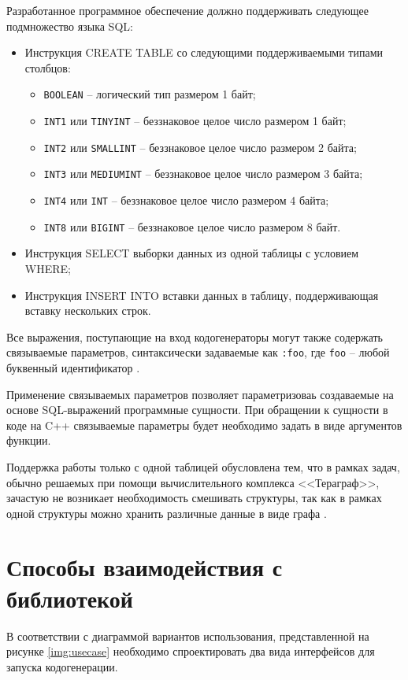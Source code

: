 Разработанное программное обеспечение должно поддерживать следующее подмножество языка SQL:
\begin{itemize}
	\item Инструкция CREATE TABLE со следующими поддерживаемыми типами столбцов:
	\begin{itemize}
		\item \texttt{BOOLEAN} -- логический тип размером 1 байт;
		\item \texttt{INT1} или \texttt{TINYINT} -- беззнаковое целое число размером 1 байт;
		\item \texttt{INT2} или \texttt{SMALLINT} -- беззнаковое целое число размером 2 байта;
		\item \texttt{INT3} или \texttt{MEDIUMINT} -- беззнаковое целое число размером 3 байта;
		\item \texttt{INT4} или \texttt{INT} -- беззнаковое целое число размером 4 байта;
		\item \texttt{INT8} или \texttt{BIGINT} -- беззнаковое целое число размером 8 байт.
	\end{itemize}
	\item Инструкция SELECT выборки данных из одной таблицы с условием WHERE;
	\item Инструкция INSERT INTO вставки данных в таблицу, поддерживающая вставку нескольких строк.
\end{itemize}

Все выражения, поступающие на вход кодогенераторы могут также содержать связываемые параметров, синтаксически задаваемые как \texttt{:foo}, где \texttt{foo} -- любой буквенный идентификатор \cite{sqlite_binding}.

Применение связываемых параметров позволяет параметризоваь создаваемые на основе SQL-выражений программные сущности.
При обращении к сущности в коде на C++ связываемые параметры будет необходимо задать в виде аргументов функции.

Поддержка работы только с одной таблицей обусловлена тем, что в рамках задач, обычно решаемых при помощи вычислительного комплекса <<Тераграф>>, зачастую не возникает необходимость смешивать структуры, так как в рамках одной структуры можно хранить различные данные в виде графа \cite{graph_practicum}.

\section{Способы взаимодействия с библиотекой}
В соответствии с диаграммой вариантов использования, представленной на рисунке \ref{img:usecase} необходимо спроектировать два вида интерфейсов для запуска кодогенерации.


